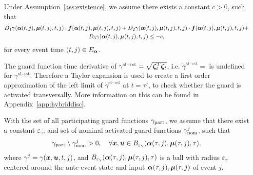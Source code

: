 \documentclass[../DC2017114Bouma.tex]{subfiles}
\begin{document}
\begin{myass}\label{ass:transversality}
Under Assumption~\ref{ass:existence}, we assume there exists a constant $c>0$, such that
\begin{multline}
D_1\gamma(\boldsymbol{\alpha}(t,j),\boldsymbol{\mu}(t,j),t,j)\cdot{\boldsymbol{f}}(\boldsymbol{\alpha}(t,j),\boldsymbol{\mu}(t,j),t,j) + D_2\gamma(\boldsymbol{\alpha}(t,j),\boldsymbol{\mu}(t,j),t,j)\cdot{\boldsymbol{f}}(\boldsymbol{\alpha}(t,j),\boldsymbol{\mu}(t,j),t,j) +\\ D_3\gamma(\boldsymbol{\alpha}(t,j),\boldsymbol{\mu}(t,j),t,j) \leq -c,
\end{multline}
for every event time $(t,j) \in E_{\boldsymbol{\alpha}}$.
\end{myass}

\begin{myremark}
The guard function time derivative of $\gamma^{\text{sl}\rightarrow\text{st}} = \sqrt{\boldsymbol{\zeta}_t^T\boldsymbol{\zeta}_t}$, i.e. $\dot{\gamma}^{\text{sl}\rightarrow\text{st}} = $ is undefined for $\gamma^{\text{sl}\rightarrow\text{st}}$. Therefore a Taylor expansion is used to create a first order approximation of the left limit of $\dot{\gamma}^{\text{sl}\rightarrow\text{st}}$ at $t = \tau^j$, to check whether the guard is activated transversally. More information on this can be found in Appendix~\ref{app:hybriddisc}. 
\end{myremark}

\begin{myass}\label{ass:guardeventpair}
With the set of all participating guard functions $\gamma_{\textnormal{part}}$, we assume that there exist a constant $\varepsilon_\gamma$, and set of nominal activated guard functions $\gamma_{\textnormal{nom}}^j$, such that
\begin{align}
\gamma_{\textnormal{part}}\setminus\gamma_{\textnormal{nom}}^j > 0,\quad \forall {\boldsymbol{x}},{\boldsymbol{u}}\in B_{\varepsilon_\gamma}(\boldsymbol{\alpha}(\tau,j),\boldsymbol{\mu}(\tau,j),\tau),
\end{align}
where $\gamma^j = \gamma({\boldsymbol{x}},{\boldsymbol{u}},t,j)$, and $B_{\varepsilon_\gamma}(\boldsymbol{\alpha}(\tau,j),\boldsymbol{\mu}(\tau,j),\tau)$ is a ball with radius $\varepsilon_{\gamma}$ centered around the ante-event state and input $\boldsymbol{\alpha}(\tau,j),\boldsymbol{\mu}(\tau,j)$ of event $j$.
\end{myass}
\end{document}
